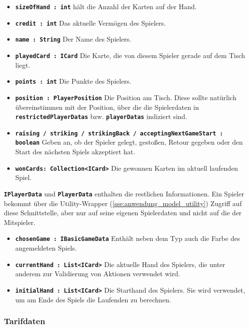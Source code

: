 \documentclass[
							a4paper, 
							11pt, 
							openany, 
							liststotoc,
							parskip=half, 
   							headings=normal
						]{scrreprt}
\begin{document}
{\begin{itemize}
	\item \textbf{\texttt{sizeOfHand : int}} hält die Anzahl der Karten auf der Hand. 
	\item \textbf{\texttt{credit : int}} Das aktuelle Vermögen des Spielers.
	\item \textbf{\texttt{name : String}} Der Name des Spielers.
	\item \textbf{\texttt{playedCard : ICard}} Die Karte, die von diesem Spieler gerade auf dem Tisch liegt.
	\item \textbf{\texttt{points : int}} Die Punkte des Spielers.
	\item \textbf{\texttt{position : PlayerPosition}} Die Position am Tisch. Diese sollte natürlich übereinstimmen mit der Position, über die die Spielerdaten in \textbf{\texttt{restrictedPlayerDatas}} bzw. \textbf{\texttt{playerDatas}} indiziert sind.
	\item \textbf{\texttt{raising / striking / strikingBack / acceptingNextGameStart : boolean}} Geben an, ob der Spieler gelegt, gestoßen, Retour gegeben oder den Start des nächsten Spiels akzeptiert hat.
	\item \textbf{\texttt{wonCards: Collection{\textless}ICard{\textgreater}}} Die gewonnen Karten im aktuell laufenden Spiel.
\end{itemize}\bigskip

\textbf{\texttt{IPlayerData}} und \textbf{\texttt{PlayerData}} enthalten die restlichen Informationen. Ein Spieler bekommt über die Utility-Wrapper (\autoref{sse:anwendung_model_utility}) Zugriff auf diese Schnittstelle, aber nur auf seine eigenen Spielerdaten und nicht auf die der Mitspieler.

\begin{itemize}
	\item \textbf{\texttt{chosenGame : IBasicGameData}} Enthält neben dem Typ auch die Farbe des angemeldeten Spiels.
	\item \textbf{\texttt{currentHand : List{\textless}ICard{\textgreater}}} Die aktuelle Hand des Spielers, die unter anderem zur Validierung von Aktionen verwendet wird.
	\item \textbf{\texttt{initialHand : List{\textless}ICard{\textgreater}}} Die Starthand des Spielers. Sie wird verwendet, um am Ende des Spiels die Laufenden zu berechnen.
\end{itemize}

\clearpage

\subsubsection{Tarifdaten} \label{ssse:anwendung_model_charge}

}
\end{document}
